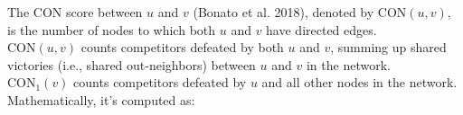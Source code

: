 \documentclass[preview]{standalone}
\begin{document}
The CON score between $u$ and $v$ (Bonato et al. 2018), denoted by $\text{CON}(u, v)$, is the number of nodes to which both $u$ and $v$ have directed edges.\\$\text{CON}(u, v)$ counts competitors defeated by both $u$ and $v$, summing up shared victories (i.e., shared out-neighbors) between $u$ and $v$ in the network.\\$\text{CON}_{1}(v)$ counts competitors defeated by $u$ and all other nodes in the network.\\Mathematically, it's computed as:\\
\end{document}
